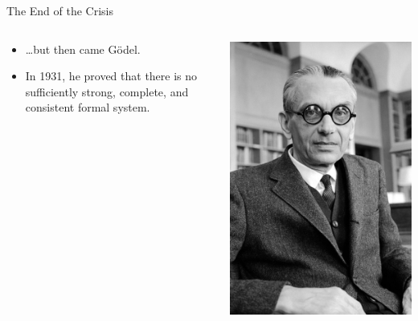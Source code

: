 \documentclass{beamer}
\begin{document}
\begin{frame}{The End of the Crisis}
\begin{columns}[T,onlytextwidth]

 \begin{column}{.49\textwidth}
    \begin{itemize}[<+->]
	\item \ldots but then came Gödel.
	\item In 1931, he proved that there is no sufficiently strong, complete, and consistent formal system.
    \end{itemize}
 \end{column}
 \begin{column}{.49\textwidth}
  \centering\includegraphics[height=0.3\textheight]{img/goedel.jpg}\\

\end{column}
\end{columns}
\end{frame}
\end{document}
